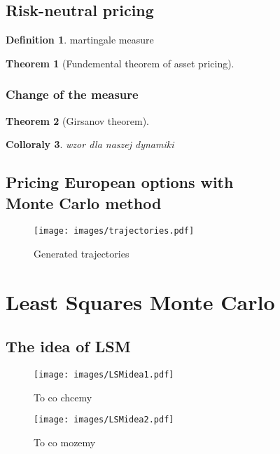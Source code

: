 \documentclass[a4paper,12pt, twoside]{book}
\newtheorem{thm}{Theorem}[section]
\newtheorem{coll}[thm]{Colloraly}
\theoremstyle{definition}
\newtheorem{mydef}{Definition}[section]
\theoremstyle{remark}
\begin{document}
\section{Risk-neutral pricing}

\begin{mydef}
 martingale measure 
\end{mydef}

\begin{thm}[Fundemental theorem of asset pricing]
 
\end{thm}

\subsection{Change of the measure}

\begin{thm}[Girsanov theorem]
 
\end{thm}

\begin{coll}
 wzor dla naszej dynamiki
\end{coll}



\section[{Pricing European options with Monte Carlo method}]{Pricing European options with \\Monte Carlo method}
\begin{figure}
\centering
 \texttt{[image: images/trajectories.pdf]}
\caption{Generated trajectories}
\end{figure}


\chapter{Least Squares Monte Carlo}
\section{The idea of LSM}
\begin{figure}[h]
\centering
 \texttt{[image: images/LSMidea1.pdf]}
\caption{To co chcemy}
\end{figure}
\begin{figure}
\centering
 \texttt{[image: images/LSMidea2.pdf]}
\caption{To co mozemy}
\end{figure}
\end{document}
